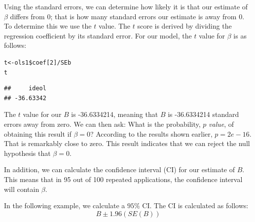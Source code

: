\documentclass[11pt,openany]{book}\usepackage[]{graphicx}\usepackage[]{color}
\makeatletter
\newcommand{\hlnum}[1]{\textcolor[rgb]{0.686,0.059,0.569}{#1}}%
\newcommand{\hlopt}[1]{\textcolor[rgb]{0,0,0}{#1}}%
\newcommand{\hlstd}[1]{\textcolor[rgb]{0.345,0.345,0.345}{#1}}%
\newcommand{\hlkwb}[1]{\textcolor[rgb]{0.69,0.353,0.396}{#1}}%
\newenvironment{kframe}{%
 \def\at@end@of@kframe{}%
 \ifinner\ifhmode%
  \def\at@end@of@kframe{\end{minipage}}%
  \begin{minipage}{\columnwidth}%
 \fi\fi%
 \def\FrameCommand##1{\hskip\@totalleftmargin \hskip-\fboxsep
 \colorbox{shadecolor}{##1}\hskip-\fboxsep
     \hskip-\linewidth \hskip-\@totalleftmargin \hskip\columnwidth}%
 \MakeFramed {\advance\hsize-\width
   \@totalleftmargin\z@ \linewidth\hsize
   \@setminipage}}%
 {\par\unskip\endMakeFramed%
 \at@end@of@kframe}
\newenvironment{knitrout}{}{} %
\renewenvironment{knitrout}{\begin{singlespace}}{\end{singlespace}}
\makeatother
\begin{document}
Using the standard errors, we can determine how likely it is that our estimate of $\beta$ differs from $0$; that is how many standard errors our estimate is away from $0$. To determine this we use the $t$ value. The $t$ score is derived by dividing the regression coefficient by its standard error. For our model, the $t$ value for $\beta$ is as follows: 
\begin{knitrout}
\color{fgcolor}\begin{kframe}
\begin{alltt}
\hlstd{t} \hlkwb{<-} \hlstd{ols1}\hlopt{\$}\hlstd{coef[}\hlnum{2}\hlstd{]}\hlopt{/}\hlstd{SEb}
\hlstd{t}
\end{alltt}
\begin{verbatim}
##     ideol 
## -36.63342
\end{verbatim}
\end{kframe}
\end{knitrout}

The $t$ value for our $B$ is -36.6334214, meaning that $B$ is -36.6334214 standard errors away from zero. We can then ask: What is the probability, $p$ \textit{value}, of obtaining this result if $\beta=0$? According to the results shown earlier, $p=2e-16$. That is remarkably close to zero. This result indicates that we can reject the null hypothesis
that $\beta=0$. 

In addition, we can calculate the confidence interval (CI) for our estimate of $B$.  This means that in 95 out of 100 repeated applications, the confidence interval will contain $\beta$. 

In the following example, we calculate a $95\%$ CI. The CI is calculated as follows: 
\begin{equation}
  \label{eq:ci}
  B \pm 1.96(SE(B))
\end{equation}
\end{document}
